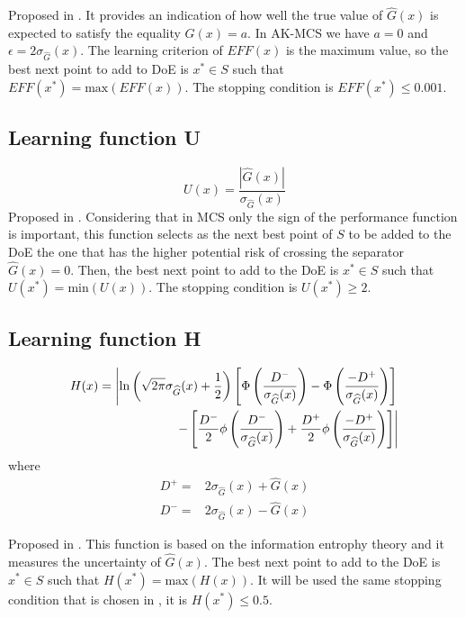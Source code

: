 Proposed in \citep{Bichon2008}. It provides an indication of how well the true value
of $\widehat{G}(x)$ is expected to satisfy the equality $G(x) = a$. In AK-MCS we have
$a = 0$ and $\epsilon = 2 \sigma_{\widehat{G}}(x)$. The learning criterion of $EFF(x)$
is the maximum value, so the best next point to add to DoE is $x^* \in S$ such that
$EFF(x^*) =\text{max}(EFF(x))$. The stopping condition is $EFF(x^*) \leq 0.001$.

\subsection{Learning function U}
\begin{equation}
    U(x) = \frac{\left\lvert \widehat{G}(x)\right\rvert }{\sigma_{\widehat{G}}(x)}
\end{equation}
Proposed in \citep{Echard2011}. Considering that in MCS only the sign of the performance
function is important, this function selects as the next best point of $S$ to be added
to the DoE the one that has the higher potential risk of crossing the separator 
$ \widehat{G}(x) = 0$. Then, the best next point to add to the DoE is $x^* \in S$ such that
$U(x^*) =\text{min}(U(x))$. The stopping condition is $U(x^*) \geq 2$.

\subsection{Learning function H}
\begin{equation}
\begin{split}  
    H(x) =  \left\lvert \ln{\left( \sqrt{2\pi}\sigma_{\widehat{G}}(x) + \frac{1}
    {2} \right)} \left[ \Phi \left( \frac{D^-}{\sigma_{\widehat{G}}(x)} \right) -
    \Phi \left( \frac{-D^+}{\sigma_{\widehat{G}}(x)} \right) \right]\right. \\ 
    \left. - \left[ \frac{D^-}{2}\phi \left( \frac{D^-}{\sigma_{\widehat{G}}(x)} \right)
    + \frac{D^+}{2} \phi \left( \frac{-D^+}{\sigma_{\widehat{G}}(x)} \right) \right] \right\rvert
\end{split}
\end{equation}
where 
\begin{align*}
    D^+ =& 2\sigma_{\widehat{G}}(x) + \widehat{G}(x) \\
    D^- =& 2\sigma_{\widehat{G}}(x) - \widehat{G}(x)
\end{align*}

Proposed in \citep{Lv2015}. This function is based on the information entrophy theory and 
it measures the uncertainty of $\widehat{G}(x)$. The best next point to add to the DoE is
$x^* \in S$ such that $H(x^*) =\text{max}(H(x))$. It will be used the same stopping
condition that is chosen in \citep{Lv2015}, it is $H(x^*) \leq 0.5$.


